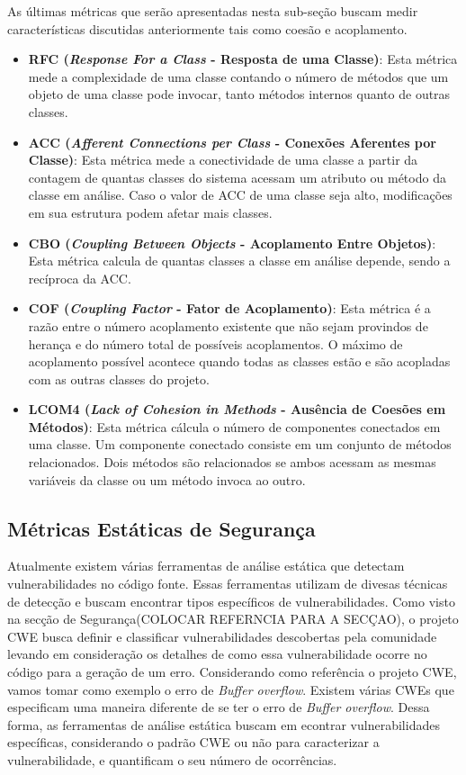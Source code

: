 %

As últimas métricas que serão apresentadas nesta sub-seção buscam medir características discutidas anteriormente tais como coesão e acoplamento.

%

\begin{itemize}
\item \textbf{RFC (\emph{Response For a Class} - Resposta de uma Classe)}: Esta métrica mede a complexidade de uma classe contando o número de métodos que um objeto de uma classe pode invocar, tanto métodos internos quanto de outras classes.
\item \textbf{ACC (\emph{Afferent Connections per Class} - Conexões Aferentes por Classe)}: Esta métrica mede a conectividade de uma classe a partir da contagem de quantas classes do sistema acessam um atributo ou método da classe em análise. Caso o valor de ACC de uma classe seja alto, modificações em sua estrutura podem afetar mais classes.
\item \textbf{CBO (\emph{Coupling Between Objects} - Acoplamento Entre Objetos)}: Esta métrica calcula de quantas classes a classe em análise depende, sendo a recíproca da ACC.
\item \textbf{COF (\emph{Coupling Factor} - Fator de Acoplamento)}: Esta métrica é a razão entre o número acoplamento existente que não sejam provindos de herança e do número total de possíveis acoplamentos. O máximo de acoplamento possível acontece quando todas as classes estão e são acopladas com as outras classes do projeto.
\item \textbf{LCOM4 (\emph{Lack of Cohesion in Methods} - Ausência de Coesões em Métodos)}: Esta métrica cálcula o número de componentes conectados em uma classe. Um componente conectado consiste em um conjunto de métodos relacionados. Dois métodos são relacionados se ambos acessam as mesmas variáveis da classe ou um método invoca ao outro.
\end{itemize}


\subsection{Métricas Estáticas de Segurança}
\label{subsec-security-metrics}

Atualmente existem várias ferramentas de análise estática que detectam vulnerabilidades no código fonte. Essas ferramentas utilizam de divesas técnicas de detecção e buscam encontrar tipos específicos de vulnerabilidades. Como visto na secção de Segurança(COLOCAR REFERNCIA PARA A SECÇAO), o projeto CWE busca definir  e classificar vulnerabilidades descobertas pela comunidade levando em consideração os detalhes de como essa vulnerabilidade ocorre no código para a geração de um erro. Considerando como referência o projeto CWE, vamos tomar como exemplo o erro de \emph{Buffer overflow}. Existem várias CWEs que especificam uma maneira diferente de se ter o erro de \emph{Buffer overflow}. Dessa forma, as ferramentas de análise estática buscam em econtrar vulnerabilidades específicas, considerando o padrão CWE ou não para caracterizar a vulnerabilidade, e quantificam o seu número de ocorrências. 

